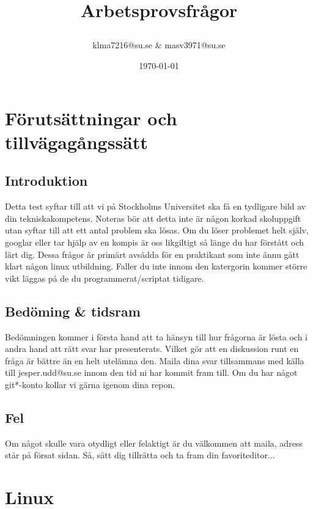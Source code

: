 \documentclass[a4paper]{report}
\title{Arbetsprovsfrågor\date{\today}}
\author{klma7216@su.se \& masv3971@su.se}
\begin{document}
    \maketitle
    \newpage

\section{Förutsättningar och tillvägagångssätt}
\subsection{Introduktion}
Detta test syftar till att vi på Stockholms Universitet ska få en tydligare bild av din tekniskakompetens. Noteras bör att detta inte är någon korkad skoluppgift utan syftar till att ett antal problem ska lösas. Om du löser problemet helt själv, googlar eller tar hjälp av en kompis är oss likgiltigt så länge du har förstått och lärt dig.
\newline
Dessa frågor är primärt avsädda för en praktikant som inte ännu gått klart någon linux utbildning. Faller du inte innom den katergorin kommer större vikt läggas på de du programmerat/scriptat tidigare.
\newline

\subsection{Bedöming \& tidsram}
Bedömningen kommer i första hand att ta hänsyn till hur frågorna är lösta och i andra hand att rätt svar har presenterats. Vilket gör att en diskussion runt en fråga är bättre än en helt utelämna den.
\newline
Maila dina svar tillsammans med källa till jesper.udd@su.se innom den tid ni har kommit fram till. Om du har något git*-konto kollar vi gärna igenom dina repon.
\newline

\subsection{Fel}
Om något skulle vara otydligt eller felaktigt är du välkommen att maila, adress står på försat sidan.
\newline
\newline
Så, sätt dig tillrätta och ta fram din favoriteditor...
    \newpage

\section{Linux}
\end{document}
